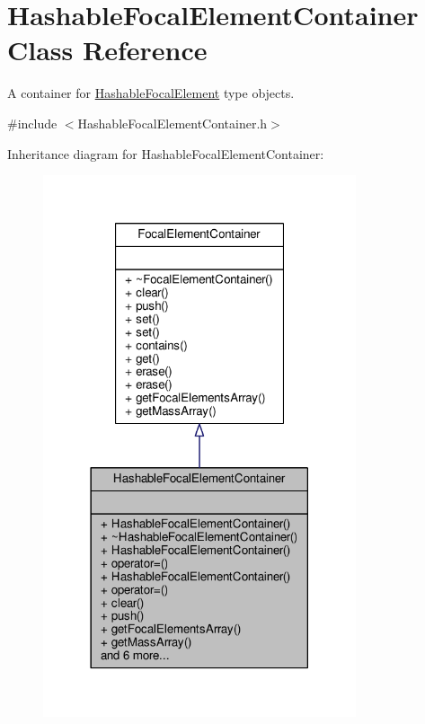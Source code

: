 \hypertarget{classHashableFocalElementContainer}{}\section{Hashable\+Focal\+Element\+Container Class Reference}
\label{classHashableFocalElementContainer}


A container for \hyperlink{classHashableFocalElement}{Hashable\+Focal\+Element} type objects.  




{\ttfamily \#include $<$Hashable\+Focal\+Element\+Container.\+h$>$}



Inheritance diagram for Hashable\+Focal\+Element\+Container\+:\nopagebreak
\begin{figure}[H]
\begin{center}
\leavevmode
\includegraphics[width=261pt]{classHashableFocalElementContainer__inherit__graph}
\end{center}
\end{figure}


